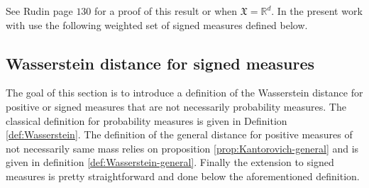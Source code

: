 \documentclass[11pt,a4paper]{article}
\newcommand{\RR}{\mathbb{R}}
\newcommand{\XF}{\mathfrak{X}}
\begin{document}
See Rudin \cite{rudin1987real} page $130$ for a proof of this result or \cite{evans2018measure} when $\XF = \RR^d$. In the present work with use the following weighted set of signed measures defined below.

\subsection{Wasserstein distance for signed measures}\label{section:Wasserstein}
The goal of this section is to introduce a definition of the Wasserstein distance for positive or signed measures that are not necessarily probability measures. The classical definition for probability measures is given in Definition \ref{def:Wasserstein}. The definition of the general distance for positive measures of not necessarily same mass relies on proposition \ref{prop:Kantorovich-general} and is given in definition \ref{def:Wasserstein-general}. Finally the extension to signed measures is pretty straightforward and done below the aforementioned definition. 
\end{document}
